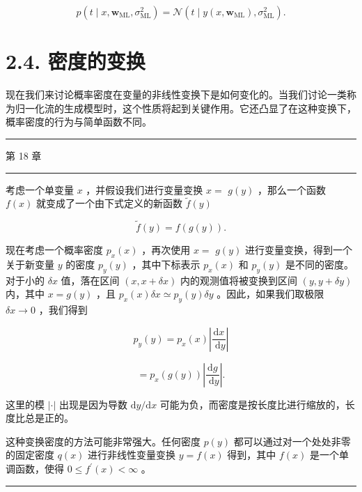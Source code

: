 \documentclass[10pt]{report}
\newcommand{\HRule}{\begin{center}\rule{0.9\linewidth}{0.2mm}\end{center}}
\begin{document}
\[
p\left( {t \mid  x,{\mathbf{w}}_{\mathrm{{ML}}},{\sigma }_{\mathrm{{ML}}}^{2}}\right)  = \mathcal{N}\left( {t \mid  y\left( {x,{\mathbf{w}}_{\mathrm{{ML}}}}\right) ,{\sigma }_{\mathrm{{ML}}}^{2}}\right) . \tag{2.69}
\]

\section*{2.4. 密度的变换}

现在我们来讨论概率密度在变量的非线性变换下是如何变化的。当我们讨论一类称为归一化流的生成模型时，这个性质将起到关键作用。它还凸显了在这种变换下，概率密度的行为与简单函数不同。

\HRule

第 18 章

\HRule

考虑一个单变量 \(x\) ，并假设我们进行变量变换 \(x =\)  \(g\left( y\right)\) ，那么一个函数 \(f\left( x\right)\) 就变成了一个由下式定义的新函数 \(\widetilde{f}\left( y\right)\)

\[
\widetilde{f}\left( y\right)  = f\left( {g\left( y\right) }\right) . \tag{2.70}
\]

现在考虑一个概率密度 \({p}_{x}\left( x\right)\) ，再次使用 \(x =\)  \(g\left( y\right)\) 进行变量变换，得到一个关于新变量 \(y\) 的密度 \({p}_{y}\left( y\right)\) ，其中下标表示 \({p}_{x}\left( x\right)\) 和 \({p}_{y}\left( y\right)\) 是不同的密度。对于小的 \({\delta x}\) 值，落在区间 \(\left( {x,x + {\delta x}}\right)\) 内的观测值将被变换到区间 \(\left( {y,y + {\delta y}}\right)\) 内，其中 \(x = g\left( y\right)\) ，且 \({p}_{x}\left( x\right) {\delta x} \simeq  {p}_{y}\left( y\right) {\delta y}\) 。因此，如果我们取极限 \({\delta x} \rightarrow  0\) ，我们得到

\[
{p}_{y}\left( y\right)  = {p}_{x}\left( x\right) \left| \frac{\mathrm{d}x}{\mathrm{\;d}y}\right|
\]

\[
= {p}_{x}\left( {g\left( y\right) }\right) \left| \frac{\mathrm{d}g}{\mathrm{\;d}y}\right| . \tag{2.71}
\]

这里的模 \(\left| \cdot \right|\) 出现是因为导数 \(\mathrm{d}y/\mathrm{d}x\) 可能为负，而密度是按长度比进行缩放的，长度比总是正的。

这种变换密度的方法可能非常强大。任何密度 \(p\left( y\right)\) 都可以通过对一个处处非零的固定密度 \(q\left( x\right)\) 进行非线性变量变换 \(y = f\left( x\right)\) 得到，其中 \(f\left( x\right)\) 是一个单调函数，使得 \(0 \leq  {f}^{\prime }\left( x\right)  < \infty\) 。

\HRule
\end{document}
